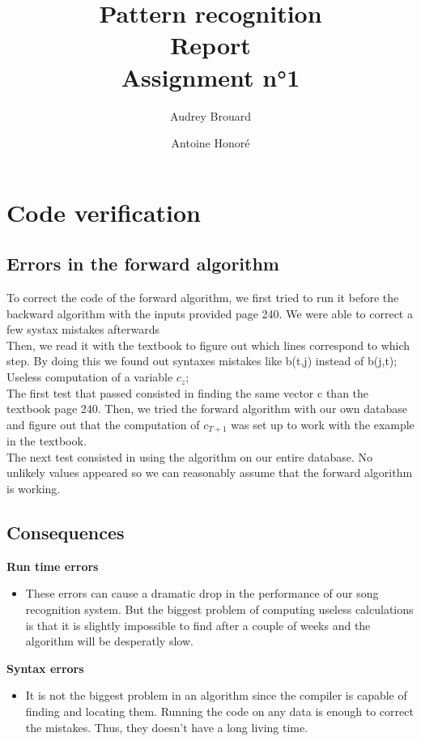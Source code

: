 \documentclass[a4paper]{report}
\title{Pattern recognition\\Report\\Assignment n°1}
\author{Audrey Brouard \and Antoine Honoré}
\newenvironment{pushright}[1]{\textbf{#1}
\begin{itemize}\item[\hspace{12pt}]}{\end{itemize}
}
\begin{document}

\section{Code verification}
\subsection{Errors in the forward algorithm}
To correct the code of the forward algorithm, we first tried to run it before the backward algorithm with the inputs provided page 240. We were able to correct a few systax mistakes afterwards\\
Then, we read it with the textbook to figure out which lines correspond to which step. By doing this we found out syntaxes mistakes like b(t,j) instead of b(j,t); Useless computation of a variable $c_z$;\\
The first test that passed consisted in finding the same vector c than the textbook page 240. Then, we tried the forward algorithm with our own database and figure out that the computation of $c_{T+1}$ was set up to work with the example in the textbook.\\
The next test consisted in using the algorithm on our entire database. No unlikely values  appeared so we can reasonably assume that the forward algorithm is working.\\

\subsection{Consequences}
\begin{pushright}{Run time errors}
  These errors can cause a dramatic drop in the performance of our song recognition system. But the biggest problem of computing useless calculations is that it is slightly impossible to find after a couple of weeks and the algorithm will be desperatly slow.
\end{pushright}

\begin{pushright}{Syntax errors}
  It is not the biggest problem in an algorithm since the compiler is capable of finding and locating them. Running the code on any data is enough to correct the mistakes. Thus, they doesn't have a long living time.
\end{pushright}
\end{document}
